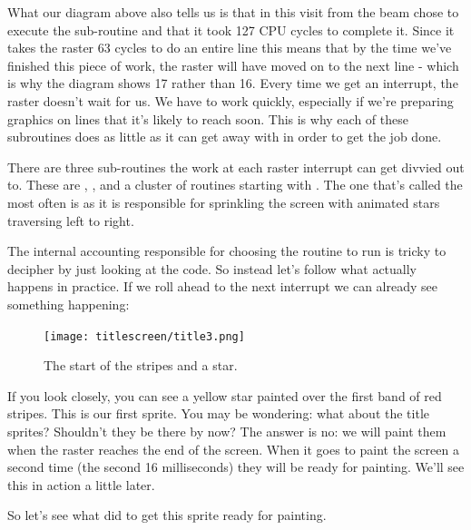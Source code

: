 What our diagram above also tells us is that in this visit from the beam  chose to execute
the sub-routine  and that it took 127 CPU cycles to complete it. Since it takes the
raster 63 cycles to do an entire line this means that by the time we've finished this piece of work, the raster will have
moved on to the next line - which is why the diagram shows 17 rather than 16. Every time we get an interrupt, the 
raster doesn't wait for us. We have to work quickly, especially if we're preparing graphics on lines that it's likely
to reach soon. This is why each of these subroutines does as little as it can get away with in order to get the job done.

There are three sub-routines the work at each raster interrupt can get divvied out to. These are ,
, and a cluster of routines starting with . The one
that's called the most often is  as it is responsible for sprinkling the screen with 
animated stars traversing left to right.


The internal accounting responsible for choosing the routine to run is tricky to decipher by just looking at the code. So
instead let's follow what actually happens in practice. If we roll ahead to the next interrupt we can already see something
happening:

\begin{figure}[H]
    \centering
      \texttt{[image: titlescreen/title3.png]}%
\caption{The start of the stripes and a star.}
\end{figure}

If you look closely, you can see a yellow star painted over the first band of red stripes. This is our first sprite. You may
be wondering: what about the title sprites? Shouldn't they be there by now? The answer is no: we will paint them when the
raster reaches the end of the screen. When it goes to paint the screen a second time (the second 16 milliseconds) they
will be ready for painting. We'll see this in action a little later.

So let's see what  did to get this sprite ready for painting.

